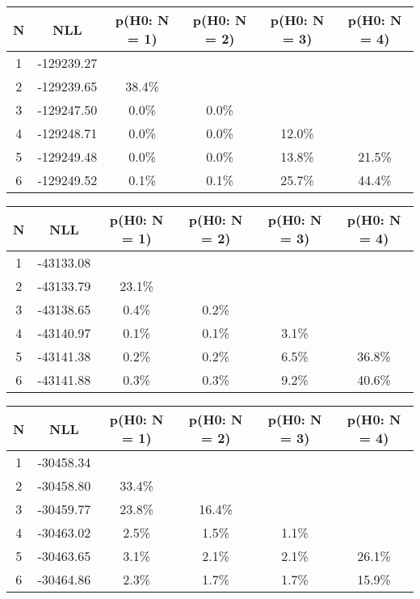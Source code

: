 \begin{table}[htb]
	\begin{center}
{\footnotesize\renewcommand{\arraystretch}{1.4}
		\begin{tabular}{cc||cccc}
			N & NLL & p(H0: N = 1) & p(H0: N = 2) & p(H0: N = 3) & p(H0: N = 4)\\ 
		\hline
1 & -129239.27 & & & & \\
2 & -129239.65 & 38.4\% & & & \\
3 & -129247.50 & 0.0\% & 0.0\% & & \\
4 & -129248.71 & 0.0\% & 0.0\% & 12.0\% & \\
5 & -129249.48 & 0.0\% & 0.0\% & 13.8\% & 21.5\% \\
6 & -129249.52 & 0.1\% & 0.1\% & 25.7\% & 44.4\% \\
	\end{tabular}
		\label{tab:lab}
	}
	\end{center}\end{table}

\begin{table}[htb]
	\begin{center}
{\footnotesize\renewcommand{\arraystretch}{1.4}
		\begin{tabular}{cc||cccc}
			N & NLL & p(H0: N = 1) & p(H0: N = 2) & p(H0: N = 3) & p(H0: N = 4)\\ 
		\hline
1 & -43133.08 & & & & \\
2 & -43133.79 & 23.1\% & & & \\
3 & -43138.65 & 0.4\% & 0.2\% & & \\
4 & -43140.97 & 0.1\% & 0.1\% & 3.1\% & \\
5 & -43141.38 & 0.2\% & 0.2\% & 6.5\% & 36.8\% \\
6 & -43141.88 & 0.3\% & 0.3\% & 9.2\% & 40.6\% \\
	\end{tabular}
		\label{tab:lab}
	}
	\end{center}\end{table}

\begin{table}[htb]
	\begin{center}
{\footnotesize\renewcommand{\arraystretch}{1.4}
		\begin{tabular}{cc||cccc}
			N & NLL & p(H0: N = 1) & p(H0: N = 2) & p(H0: N = 3) & p(H0: N = 4)\\ 
		\hline
1 & -30458.34 & & & & \\
2 & -30458.80 & 33.4\% & & & \\
3 & -30459.77 & 23.8\% & 16.4\% & & \\
4 & -30463.02 & 2.5\% & 1.5\% & 1.1\% & \\
5 & -30463.65 & 3.1\% & 2.1\% & 2.1\% & 26.1\% \\
6 & -30464.86 & 2.3\% & 1.7\% & 1.7\% & 15.9\% \\
	\end{tabular}
		\label{tab:lab}
	}
	\end{center}\end{table}

